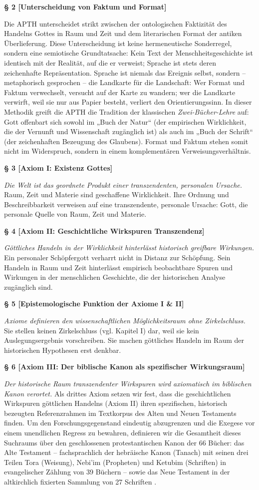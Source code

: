 \documentclass[11pt,a4paper]{article}
\makeatletter
\newcommand{\apth}{{\apthfont APTH}\hspace{0.15em}\xspace}
\newcommand{\apthsec}[3]{%
  \phantomsection%
  \def\@currentlabel{#1}%
  \label{sec:#3}%
  \textbf{§ #1 [#2]}%
}
\makeatother
\begin{document}
\apthsec{2}{Unterscheidung von Faktum und Format}{faktum-format} 
Die \apth unterscheidet strikt zwischen der ontologischen Faktizität des Handelns Gottes in Raum und Zeit und dem literarischen Format der antiken Überlieferung. Diese Unterscheidung ist keine hermeneutische Sonderregel, sondern eine semiotische Grundtatsache: Kein Text der Menschheitsgeschichte ist identisch mit der Realität, auf die er verweist; Sprache ist stets deren zeichenhafte Repräsentation. Sprache ist niemals das Ereignis selbst, sondern – metaphorisch gesprochen – die Landkarte für die Landschaft: Wer Format und Faktum verwechselt, versucht auf der Karte zu wandern; wer die Landkarte verwirft, weil sie nur aus Papier besteht, verliert den Orientierungssinn.  In dieser Methodik greift die \apth die Tradition der klassischen \textit{Zwei-Bücher-Lehre} auf: Gott offenbart sich sowohl im „Buch der Natur“ (der empirischen Wirklichkeit, die der Vernunft und Wissenschaft zugänglich ist) als auch im „Buch der Schrift“ (der zeichenhaften Bezeugung des Glaubens). Format und Faktum stehen somit nicht im Widerspruch, sondern in einem komplementären Verweisungsverhältnis.

\apthsec{3}{Axiom I: Existenz Gottes}{axiom-i} 
\textit{Die Welt ist das geordnete Produkt einer transzendenten, personalen Ursache.}
Raum, Zeit und Materie sind geschaffene Wirklichkeit. Ihre Ordnung und Beschreibbarkeit verweisen auf eine transzendente, personale Ursache: Gott, die personale Quelle von Raum, Zeit und Materie.

\apthsec{4}{Axiom II: Geschichtliche Wirkspuren Transzendenz}{axiom-ii} 
\textit{Göttliches Handeln in der Wirklichkeit hinterlässt historisch greifbare Wirkungen.}
Ein personaler Schöpfergott verharrt nicht in Distanz zur Schöpfung. Sein Handeln in Raum und Zeit hinterlässt empirisch beobachtbare Spuren und Wirkungen in der menschlichen Geschichte, die der historischen Analyse zugänglich sind.

\apthsec{5}{Epistemologische Funktion der Axiome I \& II}{axiom-funktion} 
\textit{Axiome definieren den wissenschaftlichen Möglichkeitsraum ohne Zirkelschluss.}
Sie stellen keinen Zirkelschluss (vgl. Kapitel I) dar, weil sie kein Auslegungsergebnis vorschreiben. Sie machen göttliches Handeln im Raum der historischen Hypothesen erst denkbar.

\apthsec{6}{Axiom III: Der biblische Kanon als spezifischer Wirkungsraum}{kanon} 
\textit{Der historische Raum transzendenter Wirkspuren wird axiomatisch im biblischen Kanon verortet.}
Als drittes Axiom setzen wir fest, dass die geschichtlichen Wirkspuren göttlichen Handelns (Axiom II) ihren spezifischen, historisch bezeugten Referenzrahmen im Textkorpus des Alten und Neuen Testaments finden. Um den Forschungsgegenstand eindeutig abzugrenzen und die Exegese vor einem unendlichen Regress zu bewahren, definieren wir die Gesamtheit dieses Suchraums über den geschlossenen protestantischen Kanon der 66 Bücher: das Alte Testament – fachsprachlich der hebräische Kanon (Tanach) mit seinen drei Teilen Tora (Weisung), Nebi'im (Propheten) und Ketubim (Schriften) in evangelischer Zählung von 39 Büchern – sowie das Neue Testament in der altkirchlich fixierten Sammlung von 27 Schriften \citep{beckwith1985,metzger1987}.
\end{document}
